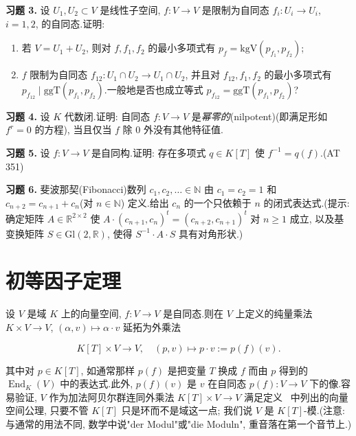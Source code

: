 \medskip
\noindent\textbf{习题 3.} 设 $U_1, U_2 \subset V$ 是线性子空间, $f \colon V \longrightarrow V$ 是限制为自同态 $f_i \colon U_i \longrightarrow U_i$, $i = 1, 2$, 的自同态.证明:
\begin{enumerate}
\item[(i)] 若 $V = U_1 + U_2$, 则对 $f, f_1, f_2$ 的最小多项式有 $p_f = \mathrm{kgV}(p_{f_1}, p_{f_2})$;
\item[(ii)] $f$ 限制为自同态 $f_{12} \colon U_1 \cap U_2 \longrightarrow U_1 \cap U_2$, 并且对 $f_{12}, f_1, f_2$ 的最小多项式有 $p_{f_{12}} \mid \mathrm{ggT}(p_{f_1}, p_{f_2})$.一般地是否也成立等式 $p_{f_{12}} = \mathrm{ggT}(p_{f_1}, p_{f_2})$?
\end{enumerate}

\medskip
\noindent\textbf{习题 4.} 设 $K$ 代数闭.证明: 自同态 $f \colon V \longrightarrow V$ 是\emph{幂零的}(\textup{nilpotent})(即满足形如 $f^r = 0$ 的方程), 当且仅当 $f$ 除 $0$ 外没有其他特征值.

\medskip
\noindent\textbf{习题 5.} 设 $f \colon V \longrightarrow V$ 是自同构.证明: 存在多项式 $q \in K[T]$ 使 $f^{-1} = q(f)$.(AT 351)

\medskip
\noindent\textbf{习题 6.} 斐波那契(Fibonacci)数列 $c_1, c_2, \ldots \in \mathbb{N}$ 由 $c_1 = c_2 = 1$ 和 $c_{n + 2} = c_{n + 1} + c_n$(对 $n \in \mathbb{N}$) 定义.给出 $c_n$ 的一个只依赖于 $n$ 的闭式表达式.(提示: 确定矩阵 $A \in \mathbb{R}^{2 \times 2}$ 使 $A \cdot (c_{n + 1}, c_n)^t = (c_{n + 2}, c_{n + 1})^t$ 对 $n \geq 1$ 成立, 以及基变换矩阵 $S \in \mathrm{Gl}(2, \mathbb{R})$, 使得 $S^{-1} \cdot A \cdot S$ 具有对角形状.)

\section{初等因子定理}\label{sec:6.3}

设 $V$ 是域 $K$ 上的向量空间, $f \colon V \longrightarrow V$ 是自同态.则在 $V$ 上定义的纯量乘法 $K \times V \longrightarrow V$, $(\alpha, v) \longmapsto \alpha \cdot v$ 延拓为外乘法

\[
K[T] \times V \longrightarrow V, \quad (p, v) \longmapsto p \cdot v := p(f)(v)\text{.}\]

其中对 $p \in K[T]$, 如通常那样 $p(f)$ 是把变量 $T$ 换成 $f$ 而由 $p$ 得到的 $\operatorname{End}_K(V)$ 中的表达式.此外, $p(f)(v)$ 是 $v$ 在自同态 $p(f) \colon V \longrightarrow V$ 下的像.容易验证, $V$ 作为加法阿贝尔群连同外乘法 $K[T] \times V \longrightarrow V$ 满足定义~ 中列出的向量空间公理, 只要不管 $K[T]$ 只是环而不是域这一点; 我们说 $V$ 是 $K[T]$-模.(注意: 与通常的用法不同, 数学中说"der Modul"或"die Moduln", 重音落在第一个音节上.)

